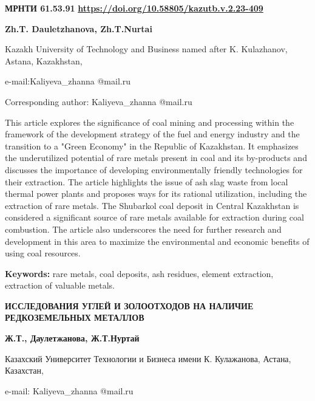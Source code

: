 \newpage
{\bfseries МРНТИ 61.53.91}
\hfill {\bfseries \href{https://doi.org/10.58805/kazutb.v.2.23-409}{https://doi.org/10.58805/kazutb.v.2.23-409}}


\begin{center}
{\bfseries Zh.T. Dauletzhanova\envelope, Zh.T.Nurtai}

Kazakh University of Technology and Business named after K. Kulazhanov,
Astana, Kazakhstan,

e-mail:Kaliyeva\_zhanna @mail.ru

\envelope Corresponding author: Kaliyeva\_zhanna @mail.ru
\end{center}

This article explores the significance of coal mining and processing
within the framework of the development strategy of the fuel and energy
industry and the transition to a "Green Economy" in the Republic of
Kazakhstan. It emphasizes the underutilized potential of rare metals
present in coal and its by-products and discusses the importance of
developing environmentally friendly technologies for their extraction.
The article highlights the issue of ash slag waste from local thermal
power plants and proposes ways for its rational utilization, including
the extraction of rare metals. The Shubarkol coal deposit in Central
Kazakhstan is considered a significant source of rare metals available
for extraction during coal combustion. The article also underscores the
need for further research and development in this area to maximize the
environmental and economic benefits of using coal resources.

{\bfseries Keywords:} rare metals, coal deposits, ash residues, element
extraction, extraction of valuable metals.

\begin{center}
{\large\bfseries ИССЛЕДОВАНИЯ УГЛЕЙ И ЗОЛООТХОДОВ НА НАЛИЧИЕ РЕДКОЗЕМЕЛЬНЫХ МЕТАЛЛОВ}

{\bfseries Ж.Т., Даулетжанова\envelope, Ж.Т.Нуртай}

Казахский Университет Технологии и Бизнеса имени К. Кулажанова, Астана,
Казахстан,

e-mail: Kaliyeva\_zhanna @mail.ru
\end{center}


